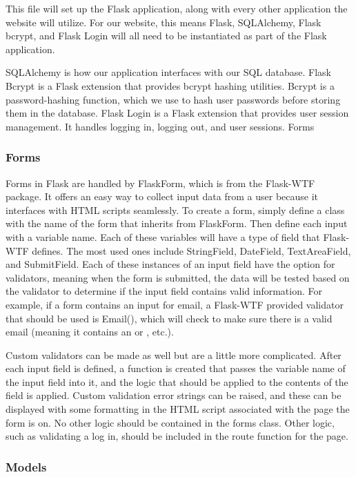 \documentclass[]{book}
\begin{document}
This file will set up the Flask application, along with every other
application the website will utilize. For our website, this means Flask,
SQLAlchemy, Flask bcrypt, and Flask Login will all need to be
instantiated as part of the Flask application.

SQLAlchemy is how our application interfaces with our SQL database.
Flask Bcrypt is a Flask extension that provides bcrypt hashing
utilities. Bcrypt is a password-hashing function, which we use to hash
user passwords before storing them in the database. Flask Login is a
Flask extension that provides user session management. It handles
logging in, logging out, and user sessions. Forms

\subsubsection{Forms}\label{forms}

Forms in Flask are handled by FlaskForm, which is from the Flask-WTF
package. It offers an easy way to collect input data from a user because
it interfaces with HTML scripts seamlessly. To create a form, simply
define a class with the name of the form that inherits from FlaskForm.
Then define each input with a variable name. Each of these variables
will have a type of field that Flask-WTF defines. The most used ones
include StringField, DateField, TextAreaField, and SubmitField. Each of
these instances of an input field have the option for validators,
meaning when the form is submitted, the data will be tested based on the
validator to determine if the input field contains valid information.
For example, if a form contains an input for email, a Flask-WTF provided
validator that should be used is Email(), which will check to make sure
there is a valid email (meaning it contains an \citet{website.com} or
\citet{website.org}, etc.).

Custom validators can be made as well but are a little more complicated.
After each input field is defined, a function is created that passes the
variable name of the input field into it, and the logic that should be
applied to the contents of the field is applied. Custom validation error
strings can be raised, and these can be displayed with some formatting
in the HTML script associated with the page the form is on. No other
logic should be contained in the forms class. Other logic, such as
validating a log in, should be included in the route function for the
page.

\subsubsection{Models}\label{models}
\end{document}
